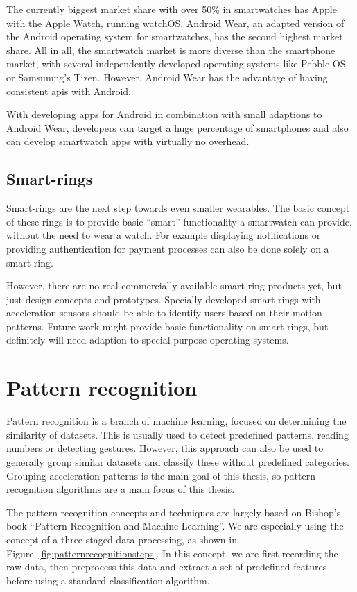 The currently biggest market share with over 50\% in smartwatches has Apple with the Apple Watch, running watchOS. Android Wear, an adapted version of the Android operating system for smartwatches, has the second highest market share. All in all, the smartwatch market is more diverse than the smartphone market, with several independently developed operating systems like Pebble OS or Samsumng's Tizen. However, Android Wear has the advantage of having consistent \Glspl{api} with Android. 

With developing \glspl{app} for Android in combination with small adaptions to Android Wear, developers can target a huge percentage of smartphones and also can develop smartwatch apps with virtually no overhead.

\subsection{Smart-rings}
Smart-rings are the next step towards even smaller wearables. The basic concept of these rings is to provide basic ``smart'' functionality a smartwatch can provide, without the need to wear a watch. For example displaying notifications or providing authentication for payment processes can also be done solely on a smart ring.

However, there are no real commercially available smart-ring products yet, but just design concepts and prototypes. Specially developed smart-rings with acceleration sensors should be able to identify users based on their motion patterns. Future work might provide basic functionality on smart-rings, but definitely will need adaption to special purpose operating systems. 

\section{Pattern recognition}
Pattern recognition is a branch of machine learning, focused on determining the similarity of datasets. This is usually used to detect predefined patterns, \eg reading numbers or detecting gestures. However, this approach can also be used to generally group similar datasets and classify these without predefined categories. Grouping acceleration patterns is the main goal of this thesis, so pattern recognition algorithms are a main focus of this thesis.

The pattern recognition concepts and techniques are largely based on Bishop's book ``Pattern Recognition and Machine Learning''\cite{bishop2006pattern}. We are especially using the concept of a three staged data processing, as shown in Figure~\ref{fig:patternrecognitionsteps}. In this concept, we are first recording the raw data, then preprocess this data and extract a set of predefined features before using a standard classification algorithm.

